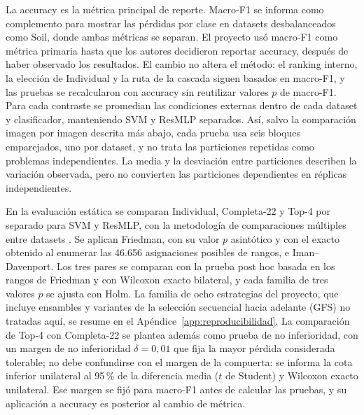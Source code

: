 \documentclass[a4paper,fleqn]{cas-sc}
\begin{document}
La accuracy es la métrica principal de reporte. Macro-F1 se informa como complemento para mostrar las pérdidas por clase en datasets desbalanceados como Soil, donde ambas métricas se separan. El proyecto usó macro-F1 como métrica primaria hasta que los autores decidieron reportar accuracy, después de haber observado los resultados. El cambio no altera el método: el ranking interno, la elección de Individual y la ruta de la cascada siguen basados en macro-F1, y las pruebas se recalcularon con accuracy sin reutilizar valores $p$ de macro-F1. Para cada contraste se promedian las condiciones externas dentro de cada dataset y clasificador, manteniendo SVM y ResMLP separados. Así, salvo la comparación imagen por imagen descrita más abajo, cada prueba usa seis bloques emparejados, uno por dataset, y no trata las particiones repetidas como problemas independientes. La media y la desviación entre particiones describen la variación observada, pero no convierten las particiones dependientes en réplicas independientes.

En la evaluación estática se comparan Individual, Completa-22 y Top-4 por separado para SVM y ResMLP, con la metodología de comparaciones múltiples entre datasets \citep{demsar2006statistical,garcia2008extension,derrac2011practical}. Se aplican Friedman, con su valor $p$ asintótico y con el exacto obtenido al enumerar las 46.656 asignaciones posibles de rangos, e Iman--Davenport. Los tres pares se comparan con la prueba post hoc basada en los rangos de Friedman y con Wilcoxon exacto bilateral, y cada familia de tres valores $p$ se ajusta con Holm. La familia de ocho estrategias del proyecto, que incluye ensambles y variantes de la selección secuencial hacia adelante (GFS) no tratadas aquí, se resume en el Apéndice~\ref{app:reproducibilidad}. La comparación de Top-4 con Completa-22 se plantea además como prueba de no inferioridad, con un margen de no inferioridad $\delta=0{,}01$ que fija la mayor pérdida considerada tolerable; no debe confundirse con el margen de la compuerta: se informa la cota inferior unilateral al 95\,\% de la diferencia media ($t$ de Student) y Wilcoxon exacto unilateral. Ese margen se fijó para macro-F1 antes de calcular las pruebas, y su aplicación a accuracy es posterior al cambio de métrica.
\end{document}
